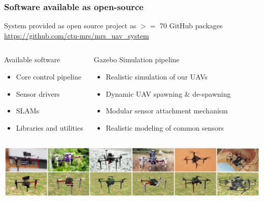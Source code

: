 \documentclass[aspectratio=169]{beamer}
\begin{document}


\begin{frame}
\frametitle{Software available as open-source}

\begin{block}{System provided as open source project as $>=$ 70 GitHub packages}
  \centering
  \Large\url{https://github.com/ctu-mrs/mrs_uav_system}
\end{block}

\begin{columns}[c]


  \begin{block}{Available software}
    \begin{itemize}
      \item Core control pipeline
      \item Sensor drivers
      \item SLAMs
      \item Libraries and utilities
    \end{itemize}
  \end{block}


  \begin{block}{Gazebo Simulation pipeline}
    \begin{itemize}
      \item Realistic simulation of our UAVs
      \item Dynamic UAV spawning \& de-spawning
      \item Modular sensor attachment mechanism
      \item Realistic modeling of common sensors
    \end{itemize}
  \end{block}

\end{columns}

\includegraphics[width=1.0\textwidth]{./fig/uavs.png}

\end{frame}
\end{document}
